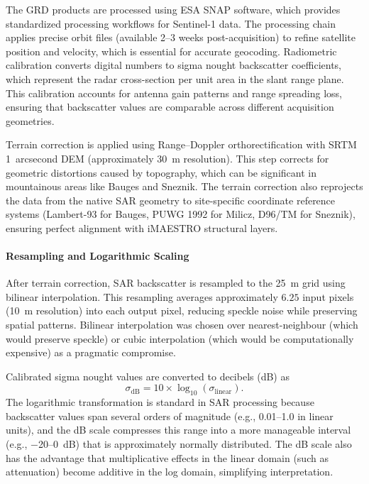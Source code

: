 The GRD products are processed using ESA SNAP software, which provides standardized processing workflows for Sentinel-1 data. The processing chain applies precise orbit files (available 2--3 weeks post-acquisition) to refine satellite position and velocity, which is essential for accurate geocoding. Radiometric calibration converts digital numbers to sigma nought backscatter coefficients, which represent the radar cross-section per unit area in the slant range plane. This calibration accounts for antenna gain patterns and range spreading loss, ensuring that backscatter values are comparable across different acquisition geometries.

Terrain correction is applied using Range--Doppler orthorectification with SRTM \SI{1}{arcsecond} DEM (approximately \SI{30}{\meter} resolution). This step corrects for geometric distortions caused by topography, which can be significant in mountainous areas like Bauges and Sneznik. The terrain correction also reprojects the data from the native SAR geometry to site-specific coordinate reference systems (Lambert-93 for Bauges, PUWG 1992 for Milicz, D96/TM for Sneznik), ensuring perfect alignment with iMAESTRO structural layers.

\paragraph{Resampling and Logarithmic Scaling}

After terrain correction, SAR backscatter is resampled to the \SI{25}{\meter} grid using bilinear interpolation. This resampling averages approximately $6.25$ input pixels (\SI{10}{\meter} resolution) into each output pixel, reducing speckle noise while preserving spatial patterns. Bilinear interpolation was chosen over nearest-neighbour (which would preserve speckle) or cubic interpolation (which would be computationally expensive) as a pragmatic compromise.

Calibrated sigma nought values are converted to decibels (dB) as
\begin{equation}
    \sigma_{\text{dB}} = 10 \times \log_{10}(\sigma_{\text{linear}}).
\end{equation}
The logarithmic transformation is standard in SAR processing because backscatter values span several orders of magnitude (e.g., \numrange{0.01}{1.0} in linear units), and the dB scale compresses this range into a more manageable interval (e.g., \numrange{-20}{0}~dB) that is approximately normally distributed. The dB scale also has the advantage that multiplicative effects in the linear domain (such as attenuation) become additive in the log domain, simplifying interpretation.

